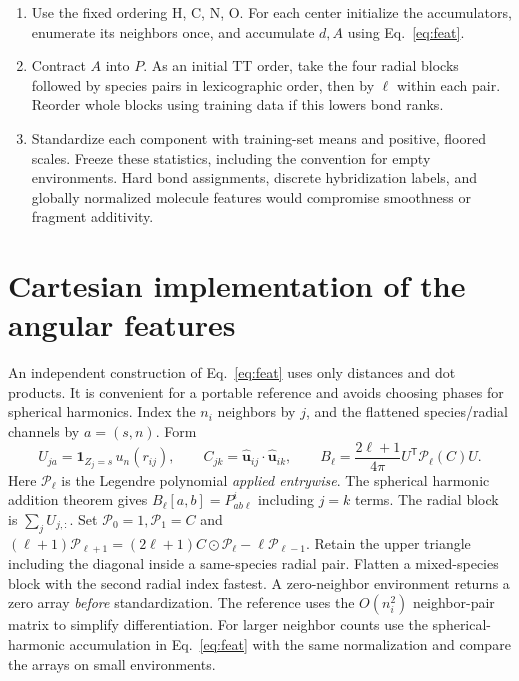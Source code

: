 \documentclass[11pt,a4paper]{article}
\newcommand{\T}{\mathsf T}\newcommand{\tr}{\operatorname{tr}}
\begin{document}
\begin{enumerate}
\item Use the fixed ordering H, C, N, O. For each center initialize the accumulators, enumerate its neighbors once, and accumulate $d,A$ using Eq.~\eqref{eq:feat}.
\item Contract $A$ into $P$. As an initial TT order, take the four radial blocks followed by species pairs in lexicographic order, then by $\ell$ within each pair. Reorder whole blocks using training data if this lowers bond ranks.
\item Standardize each component with training-set means and positive, floored scales. Freeze these statistics, including the convention for empty environments. Hard bond assignments, discrete hybridization labels, and globally normalized molecule features would compromise smoothness or fragment additivity.
\end{enumerate}
\pg\section{Cartesian implementation of the angular features}
An independent construction of Eq.~\eqref{eq:feat} uses only distances and dot products. It is convenient for a portable reference and avoids choosing phases for spherical harmonics. Index the $n_i$ neighbors by $j$, and the flattened species/radial channels by $a=(s,n)$. Form
\[
 U_{ja}=\mathbf 1_{Z_j=s}\,u_n(r_{ij}),\qquad
 C_{jk}=\hat{\mathbf u}_{ij}\cdot\hat{\mathbf u}_{ik},\qquad
 B_\ell=\frac{2\ell+1}{4\pi}U^\T \mathcal P_\ell(C) U .
\]
Here $\mathcal P_\ell$ is the Legendre polynomial \emph{applied entrywise}. The spherical harmonic addition theorem gives $B_\ell[a,b]=P^i_{ab\ell}$ including $j=k$ terms. The radial block is $\sum_j U_{j,:}$. Set $\mathcal P_0=1,\mathcal P_1=C$ and $(\ell+1)\mathcal P_{\ell+1}=(2\ell+1)C\odot\mathcal P_\ell-\ell\mathcal P_{\ell-1}$. Retain the upper triangle including the diagonal inside a same-species radial pair. Flatten a mixed-species block with the second radial index fastest. A zero-neighbor environment returns a zero array \emph{before} standardization. The reference uses the $O(n_i^2)$ neighbor-pair matrix to simplify differentiation. For larger neighbor counts use the spherical-harmonic accumulation in Eq.~\eqref{eq:feat} with the same normalization and compare the arrays on small environments.
\end{document}
